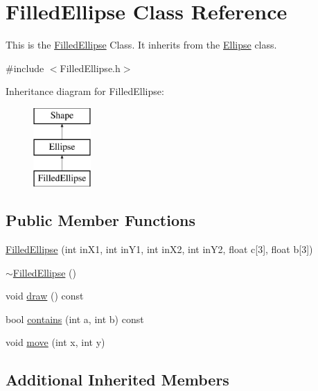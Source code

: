 \hypertarget{classFilledEllipse}{\section{Filled\-Ellipse Class Reference}
\label{classFilledEllipse}
}


This is the \hyperlink{classFilledEllipse}{Filled\-Ellipse} Class. It inherits from the \hyperlink{classEllipse}{Ellipse} class.  




{\ttfamily \#include $<$Filled\-Ellipse.\-h$>$}

Inheritance diagram for Filled\-Ellipse\-:\begin{figure}[H]
\begin{center}
\leavevmode
\includegraphics[height=3.000000cm]{classFilledEllipse}
\end{center}
\end{figure}
\subsection*{Public Member Functions}
\begin{DoxyCompactItemize}
\item 
\hyperlink{classFilledEllipse_aa3dfc1a2b1428966984ee92ee0e4a18b}{Filled\-Ellipse} (int in\-X1, int in\-Y1, int in\-X2, int in\-Y2, float c\mbox{[}3\mbox{]}, float b\mbox{[}3\mbox{]})
\item 
\hyperlink{classFilledEllipse_a46d02d99024ca857cb5e08187b2d265f}{$\sim$\-Filled\-Ellipse} ()
\item 
void \hyperlink{classFilledEllipse_a6010d7760f8418439ecdbcc1dcfe9b4c}{draw} () const 
\item 
bool \hyperlink{classFilledEllipse_a1b18f3c89f3d44a0d091b4a5a5890816}{contains} (int a, int b) const 
\item 
void \hyperlink{classFilledEllipse_a3fd1d3d0b506716399ec543a32a3c450}{move} (int x, int y)
\end{DoxyCompactItemize}
\subsection*{Additional Inherited Members}


